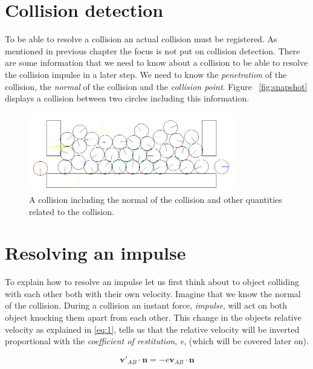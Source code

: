 \documentclass[a4paper,12pt]{report}
\begin{document}
\section{Collision detection}

To be able to resolve a collision an actual collision must be registered. As mentioned in previous chapter the focus is not put on collision detection. There are some information that we need to know about a collision to be able to resolve the collision impulse in a later step. We need to know the \emph{penetration} of the collision, the \emph{normal} of the collision and the \emph{collision point}. Figure ~\ref{fig:snapshot} displays a collision between two circles including this information.

\begin{figure}[!h]
    \centering
    \includegraphics[width=0.8\textwidth]{figures/snapshot.png}
    \caption{A collision including the normal of the collision and other quantities related to the collision.}
    \label{fig:collision}
\end{figure}

\section{Resolving an impulse}

To explain how to resolve an impulse\cite{gdm} let us first think about to object colliding with each other both with their own velocity. Imagine that we know the normal of the collision. During a collision an instant force, \emph{impulse}, will act on both object knocking them apart from each other. This change in the objects relative velocity as explained in \ref{eq:1}, tells us that the relative velocity will be inverted proportional with the \emph{coefficient of restitution}, \emph{e},  (which will be covered later on).

\begin{equation}
\mathbf v'_{AB}\cdot \mathbf n=-e\mathbf v_{AB}\cdot \mathbf n
\label{eq:1}
\end{equation}
\end{document}
